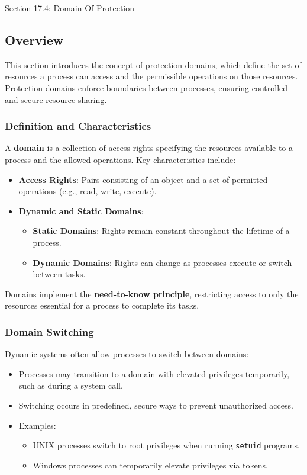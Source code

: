 \begin{notes}{Section 17.4: Domain Of Protection}
    \subsection*{Overview}

    This section introduces the concept of protection domains, which define the set of resources a process can access and the permissible operations on those resources. Protection domains enforce 
    boundaries between processes, ensuring controlled and secure resource sharing.
    
    \subsubsection*{Definition and Characteristics}
    
    A \textbf{domain} is a collection of access rights specifying the resources available to a process and the allowed operations. Key characteristics include:
    \begin{itemize}
        \item \textbf{Access Rights}: Pairs consisting of an object and a set of permitted operations (e.g., read, write, execute).
        \item \textbf{Dynamic and Static Domains}:
        \begin{itemize}
            \item \textbf{Static Domains}: Rights remain constant throughout the lifetime of a process.
            \item \textbf{Dynamic Domains}: Rights can change as processes execute or switch between tasks.
        \end{itemize}
    \end{itemize}
    Domains implement the \textbf{need-to-know principle}, restricting access to only the resources essential for a process to complete its tasks.
    
    \subsubsection*{Domain Switching}
    
    Dynamic systems often allow processes to switch between domains:
    \begin{itemize}
        \item Processes may transition to a domain with elevated privileges temporarily, such as during a system call.
        \item Switching occurs in predefined, secure ways to prevent unauthorized access.
        \item Examples:
        \begin{itemize}
            \item UNIX processes switch to root privileges when running \texttt{setuid} programs.
            \item Windows processes can temporarily elevate privileges via tokens.
        \end{itemize}
    \end{itemize}
    

\end{notes}
